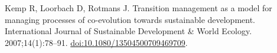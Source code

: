 \documentclass[10pt,a4paper]{article}
\begin{document}
\begin{multicols}{2}
\begin{footnotesize}
\begin{thebibliography}{10}
Kemp R, Loorbach D, Rotmans J.
\newblock Transition management as a model for managing processes of
  co-evolution towards sustainable development.
\newblock International Journal of Sustainable Development {\&} World Ecology.
  2007;14(1):78--91.
\newblock
  \href{https://doi.org/10.1080/13504500709469709}{doi:10.1080/13504500709469709}.

\end{thebibliography}



\end{footnotesize}

\end{multicols}
\end{document}
